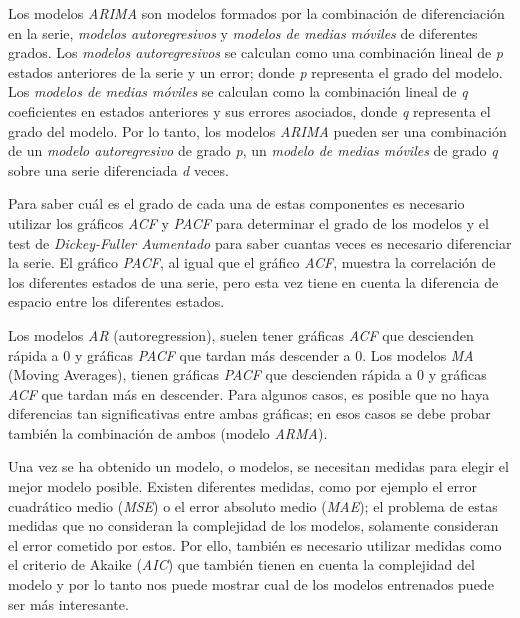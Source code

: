 Los modelos \textit{ARIMA} son modelos formados por la combinación de diferenciación en la serie, \textit{modelos autoregresivos} y \textit{modelos de medias móviles} de diferentes grados. Los \textit{modelos autoregresivos} se calculan como una combinación lineal de \textit{p} estados anteriores de la serie y un error; donde \textit{p} representa el grado del modelo. Los \textit{modelos de medias móviles} se calculan como la combinación lineal de \textit{q} coeficientes en estados anteriores y sus errores asociados, donde \textit{q} representa el grado del modelo. Por lo tanto, los modelos \textit{ARIMA} pueden ser una combinación de un \textit{modelo autoregresivo} de grado \textit{p}, un \textit{modelo de medias móviles} de grado \textit{q} sobre una serie diferenciada \textit{d} veces. \newline

Para saber cuál es el grado de cada una de estas componentes es necesario utilizar los gráficos \textit{ACF} y \textit{PACF} para determinar el grado de los modelos y el test de \textit{Dickey-Fuller Aumentado} para saber cuantas veces es necesario diferenciar la serie. El gráfico \textit{PACF}, al igual que el gráfico \textit{ACF}, muestra la correlación de los diferentes estados de una serie, pero esta vez tiene en cuenta la diferencia de espacio entre los diferentes estados.\newline

Los modelos \textit{AR} (autoregression), suelen tener gráficas \textit{ACF} que descienden rápida a 0 y gráficas \textit{PACF} que tardan más descender a 0. Los modelos \textit{MA} (Moving Averages), tienen gráficas \textit{PACF} que descienden rápida a 0 y gráficas \textit{ACF} que tardan más en descender. Para algunos casos, es posible que no haya diferencias tan significativas entre ambas gráficas; en esos casos se debe probar también la combinación de ambos (modelo \textit{ARMA}).\newline

Una vez se ha obtenido un modelo, o modelos, se necesitan medidas para elegir el mejor modelo posible. Existen diferentes medidas, como por ejemplo el error cuadrático medio (\textit{MSE}) o el error absoluto medio (\textit{MAE}); el problema de estas medidas que no consideran la complejidad de los modelos, solamente consideran el error cometido por estos. Por ello, también es necesario utilizar medidas como el criterio de Akaike (\textit{AIC}) que también tienen en cuenta la complejidad del modelo y por lo tanto nos puede mostrar cual de los modelos entrenados puede ser más interesante.